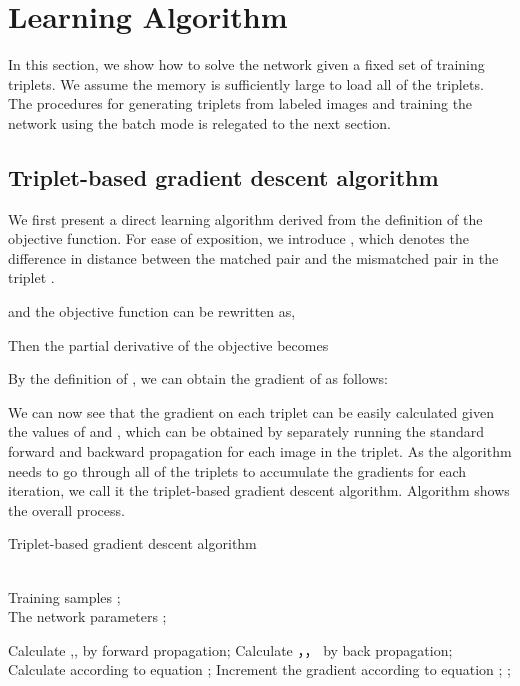 \documentclass[review]{elsarticle}
\begin{document}
\section{Learning Algorithm}
In this section, we show how to solve the network given a fixed set of training triplets. We assume the memory is sufficiently large to load all of the triplets. The procedures for generating triplets from labeled images and training the network using the batch mode is relegated to the next section.
\subsection{Triplet-based gradient descent algorithm}
We first present a direct learning algorithm derived from the definition of the objective function. For ease of exposition, we introduce , which denotes the difference in distance between the matched pair and the mismatched pair in the triplet .
\begin{small}

\end{small}
and the objective function can be rewritten as,
\begin{small}

\end{small}
Then the partial derivative of the objective becomes
\begin{small}

\end{small}
\begin{small}

\end{small}
By the definition of , we can obtain the gradient of   as follows:
\begin{small}

\end{small}
We can now see that the gradient on each triplet can be easily calculated given the values of  and , which can be obtained by separately running the standard forward and backward propagation for each image in the triplet. As the algorithm needs to go through all of the triplets to accumulate the gradients for each iteration, we call it the triplet-based gradient descent algorithm. Algorithm  shows the overall process.
\begin{algorithm}[htb]        \caption{Triplet-based gradient descent algorithm }             \label{alg:gradDescentByTriplet}                  
\begin{algorithmic}[1]                
\REQUIRE ~~\\                          Training samples ;
\ENSURE ~~\\                           The network parameters 
\WHILE    {}
\STATE ;
\STATE 

    \STATE  Calculate  ,, by forward propagation;
    \STATE Calculate ，， by back propagation;
    \STATE Calculate  according to equation ;
    \STATE Increment the gradient  according to equation ;
       \ENDFOR
\STATE ;
\ENDWHILE          
\end{algorithmic}
\end{algorithm}
\end{document}
